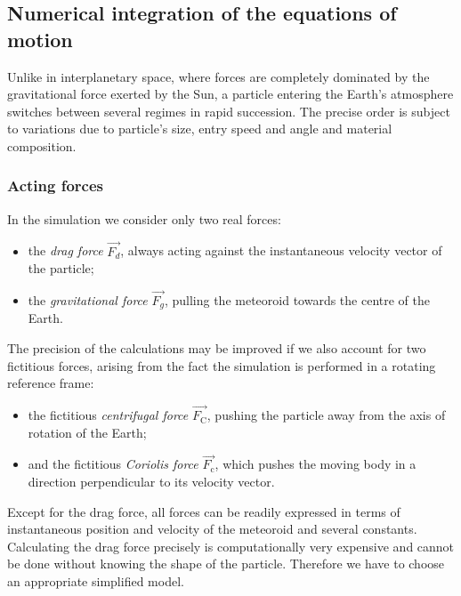     \subsection{Numerical integration of the equations of motion} \label{sai}
        Unlike in interplanetary space, where forces are completely dominated by the gravitational force exerted by the Sun,
        a particle entering the Earth's atmosphere switches between several regimes in rapid succession.
        The precise order is subject to variations due to particle's size, entry speed and angle
        and material composition.



        \subsubsection{Acting forces} \label{saia}
            In the simulation we consider only two real forces:
            \begin{itemize}
                \item the \emph{drag force} $\vec{F_d}$, always acting against the instantaneous velocity vector of the particle;
                \item the \emph{gravitational force} $\vec{F_g}$, pulling the meteoroid towards the centre of the Earth.
            \end{itemize}

            The precision of the calculations may be improved if we also account for two fictitious forces,
            arising from the fact the simulation is performed in a rotating reference frame:
            \begin{itemize}
                \item the fictitious \emph{centrifugal force} $\vec{F_{\mathrm{C}}}$,
                    pushing the particle away from the axis of rotation of the Earth;
                \item and the fictitious \emph{Coriolis force} $\vec{F_{\mathrm{c}}}$,
                    which pushes the moving body in a direction perpendicular to its velocity vector.
            \end{itemize}

            Except for the drag force, all forces can be readily expressed in terms of instantaneous
            position and velocity of the meteoroid and several constants.
            Calculating the drag force precisely is computationally very expensive and cannot be done
            without knowing the shape of the particle. Therefore we have to choose an appropriate simplified model.

